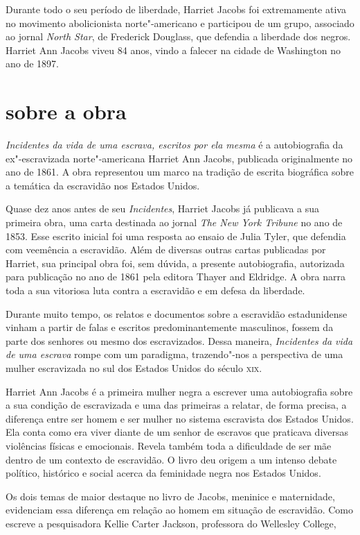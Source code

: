 Durante todo o seu período de liberdade, Harriet Jacobs foi extremamente ativa no movimento
abolicionista norte"-americano e participou de um grupo, associado ao
jornal \textit{North Star}, de Frederick Douglass, que defendia a liberdade dos negros.
Harriet Ann Jacobs viveu 84 anos, vindo a falecer na cidade de Washington no ano de 1897.


\section{sobre a obra}

\emph{Incidentes da vida de uma escrava, escritos por ela mesma} é a
autobiografia da ex"-escravizada norte"-americana Harriet Ann Jacobs,
publicada originalmente no ano de 1861. A obra representou um marco na
tradição de escrita biográfica sobre a temática da escravidão nos
Estados Unidos.

Quase dez anos antes de seu \textit{Incidentes}, Harriet Jacobs já publicava a sua primeira obra, uma carta destinada ao jornal
\emph{The New York Tribune} no ano de 1853. Esse escrito inicial foi
uma resposta ao ensaio de Julia Tyler, que defendia com veemência a
escravidão. Além de diversas outras cartas publicadas por Harriet, sua
principal obra foi, sem dúvida, a presente autobiografia, autorizada para publicação no ano de 1861 pela editora Thayer and Eldridge. A obra narra toda a sua vitoriosa luta contra a escravidão e em defesa da liberdade.

Durante muito tempo, os relatos e documentos sobre a escravidão
estadunidense vinham a partir de falas e escritos predominantemente
masculinos, fossem da parte dos senhores ou mesmo dos escravizados.
Dessa maneira, \emph{Incidentes da vida de uma escrava} rompe com um
paradigma, trazendo"-nos a perspectiva de uma mulher
escravizada no sul dos Estados Unidos do século \textsc{xix}.

Harriet Ann Jacobs é a primeira mulher negra a escrever uma
autobiografia sobre a sua condição de escravizada e uma das primeiras a
relatar, de forma precisa, a diferença entre ser homem e ser mulher no
sistema escravista dos Estados Unidos. Ela conta como era viver diante
de um senhor de escravos que praticava diversas violências físicas e
emocionais. Revela também toda a dificuldade de ser mãe dentro de um
contexto de escravidão. O livro deu origem a um intenso debate político,
histórico e social acerca da feminidade negra nos Estados Unidos.

Os dois temas de maior destaque no livro de Jacobs, meninice e maternidade, evidenciam essa diferença em relação ao homem em situação de escravidão.
Como escreve a pesquisadora Kellie Carter Jackson, professora do Wellesley College,

